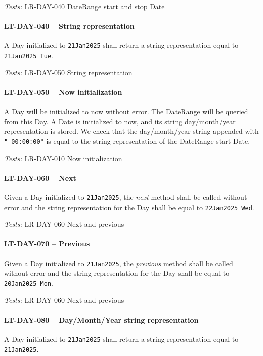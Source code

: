 \textit{Tests: } LR-DAY-040 DateRange start and stop Date

\paragraph{LT-DAY-040 -- String representation}
A Day initialized to \lstinline{21Jan2025} shall return a string
representation equal to \lstinline{21Jan2025 Tue}.

\textit{Tests: } LR-DAY-050 String representation

\paragraph{LT-DAY-050 -- Now initialization}
A Day will be initialized to now without error. The DateRange will be queried
from this Day.
A Date is initialized to now, and its string day/month/year representation
is stored.
We check that the day/month/year string appended with \lstinline{" 00:00:00"} is
equal to the string representation of the DateRange start Date.

\textit{Tests: } LR-DAY-010 Now initialization

\paragraph{LT-DAY-060 -- Next}
Given a Day initialized to \lstinline{21Jan2025}, the \emph{next} method
shall be called without error and the string representation for the Day
shall be equal to \lstinline{22Jan2025 Wed}.

\textit{Tests: } LR-DAY-060 Next and previous

\paragraph{LT-DAY-070 -- Previous}
Given a Day initialized to \lstinline{21Jan2025}, the \emph{previous} method
shall be called without error and the string representation for the Day
shall be equal to \lstinline{20Jan2025 Mon}.

\textit{Tests: } LR-DAY-060 Next and previous

\paragraph{LT-DAY-080 -- Day/Month/Year string representation}
A Day initialized to \lstinline{21Jan2025} shall return a string
representation equal to \lstinline{21Jan2025}.


